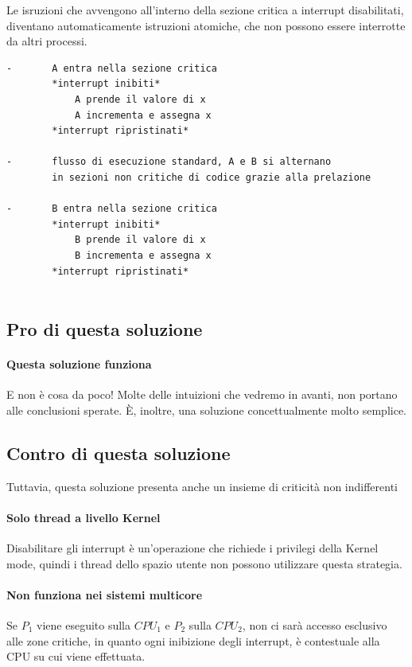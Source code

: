 \documentclass{report}
\begin{document}
Le isruzioni che avvengono all'interno della sezione critica a interrupt disabilitati, diventano automaticamente istruzioni atomiche, che non possono essere interrotte da altri processi.
\begin{verbatim}
-       A entra nella sezione critica
        *interrupt inibiti*
            A prende il valore di x
            A incrementa e assegna x
        *interrupt ripristinati*
        
-       flusso di esecuzione standard, A e B si alternano 
        in sezioni non critiche di codice grazie alla prelazione
        
-       B entra nella sezione critica
        *interrupt inibiti*
            B prende il valore di x
            B incrementa e assegna x
        *interrupt ripristinati*
        
\end{verbatim}

\subsection{Pro di questa soluzione}

\paragraph{Questa soluzione funziona} E non è cosa da poco! Molte delle intuizioni che vedremo in avanti, non portano alle conclusioni sperate. È, inoltre, una soluzione concettualmente molto semplice.

\subsection{Contro di questa soluzione}
Tuttavia, questa soluzione presenta anche un insieme di criticità non indifferenti
\paragraph{Solo thread a livello Kernel} Disabilitare gli interrupt è un'operazione che richiede i privilegi della Kernel mode, quindi i thread dello spazio utente non possono utilizzare questa strategia.
\paragraph{Non funziona nei sistemi multicore} Se $P_1$ viene eseguito sulla $CPU_1$ e $P_2$ sulla $CPU_2$, non ci sarà accesso esclusivo alle zone critiche, in quanto ogni inibizione degli interrupt, è contestuale alla CPU su cui viene effettuata.
\end{document}
